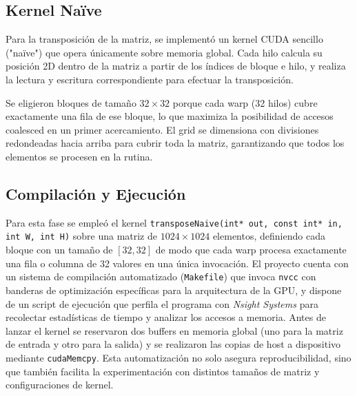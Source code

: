 \documentclass[a4paper,11pt]{article}
\begin{document}
\subsection{Kernel Naïve}
Para la transposición de la matriz, se implementó un kernel CUDA sencillo ("naïve") que opera únicamente sobre memoria global. Cada hilo calcula su posición 2D dentro de la matriz a partir de los índices de bloque e hilo, y realiza la lectura y escritura correspondiente para efectuar la transposición.

Se eligieron bloques de tamaño $32\times32$ porque cada warp (32 hilos) cubre exactamente una fila de ese bloque, lo que maximiza la posibilidad de accesos coalesced en un primer acercamiento. El grid se dimensiona con divisiones redondeadas hacia arriba para cubrir toda la matriz, garantizando que todos los elementos se procesen en la rutina.


\subsection{Compilación y Ejecución}
Para esta fase se empleó el kernel \texttt{transposeNaive(int* out, const int* in, int W, int H)} sobre una matriz de \(1024\times1024\) elementos, definiendo cada bloque con un tamaño de \([32,32]\) de modo que cada warp procesa exactamente una fila o columna de 32 valores en una única invocación. El proyecto cuenta con un sistema de compilación automatizado (\texttt{Makefile}) que invoca \texttt{nvcc} con banderas de optimización específicas para la arquitectura de la GPU, y dispone de un script de ejecución que perfila el programa con \textit{Nsight Systems} para recolectar estadísticas de tiempo y analizar los accesos a memoria. Antes de lanzar el kernel se reservaron dos buffers en memoria global (uno para la matriz de entrada y otro para la salida) y se realizaron las copias de host a dispositivo mediante \texttt{cudaMemcpy}. Esta automatización no solo asegura reproducibilidad, sino que también facilita la experimentación con distintos tamaños de matriz y configuraciones de kernel.
\end{document}
